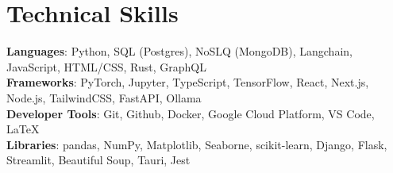 \documentclass[letterpaper,11pt]{article}
\begin{document}
%
\section{Technical Skills}
 \begin{itemize}[leftmargin=0.15in, label={}]
    \small{\item{
     \textbf{Languages}{: Python, SQL (Postgres), NoSLQ (MongoDB), Langchain, JavaScript, HTML/CSS, Rust, GraphQL} \\
     \textbf{Frameworks}{: PyTorch, Jupyter, TypeScript, TensorFlow, React, Next.js, Node.js, TailwindCSS, FastAPI, Ollama} \\
     \textbf{Developer Tools}{: Git, Github, Docker, Google Cloud Platform, VS Code, \LaTeX} \\
     \textbf{Libraries}{: pandas, NumPy, Matplotlib, Seaborne, scikit-learn, Django, Flask, Streamlit, Beautiful Soup, Tauri, Jest} \\
    }}
 \end{itemize}
\end{document}
